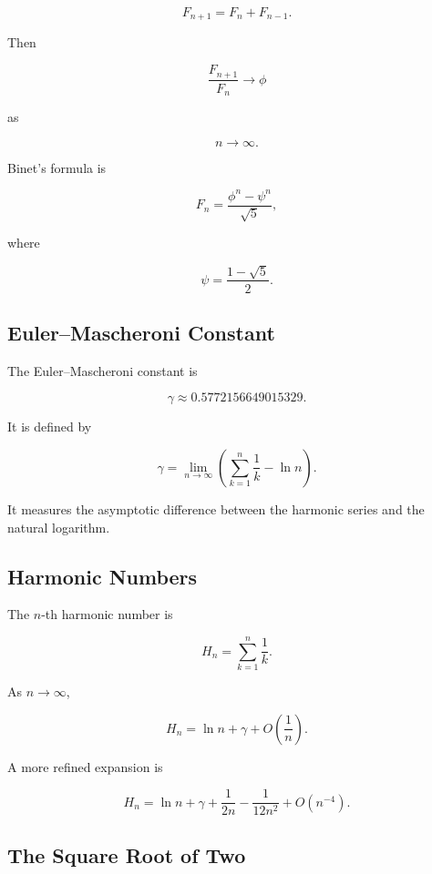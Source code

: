 \[
F_{n+1}
=
F_n+F_{n-1}.
\]

Then

\[
\boxed{
\frac{F_{n+1}}{F_n}
\to
\phi
}
\]

as

\[
n\to\infty.
\]

Binet's formula is

\[
\boxed{
F_n
=
\frac{
\phi^n-\psi^n
}{
\sqrt5
},
}
\]

where

\[
\psi
=
\frac{1-\sqrt5}{2}.
\]

\subsection{Euler--Mascheroni Constant}
\label{subsec:euler-mascheroni-reference}

The Euler--Mascheroni constant is

\[
\boxed{
\gamma
\approx
0.5772156649015329.
}
\]

It is defined by

\[
\boxed{
\gamma
=
\lim_{n\to\infty}
\left(
\sum_{k=1}^{n}\frac1k
-
\ln n
\right).
}
\]

It measures the asymptotic difference between the harmonic series and the
natural logarithm.

\subsection{Harmonic Numbers}
\label{subsec:harmonic-numbers-constant-reference}

The \(n\)-th harmonic number is

\[
\boxed{
H_n
=
\sum_{k=1}^{n}
\frac1k.
}
\]

As \(n\to\infty\),

\[
\boxed{
H_n
=
\ln n
+
\gamma
+
O\left(\frac1n\right).
}
\]

A more refined expansion is

\[
\boxed{
H_n
=
\ln n
+
\gamma
+
\frac{1}{2n}
-
\frac{1}{12n^2}
+
O(n^{-4}).
}
\]

\subsection{The Square Root of Two}
\label{subsec:sqrt2-constant-reference}

